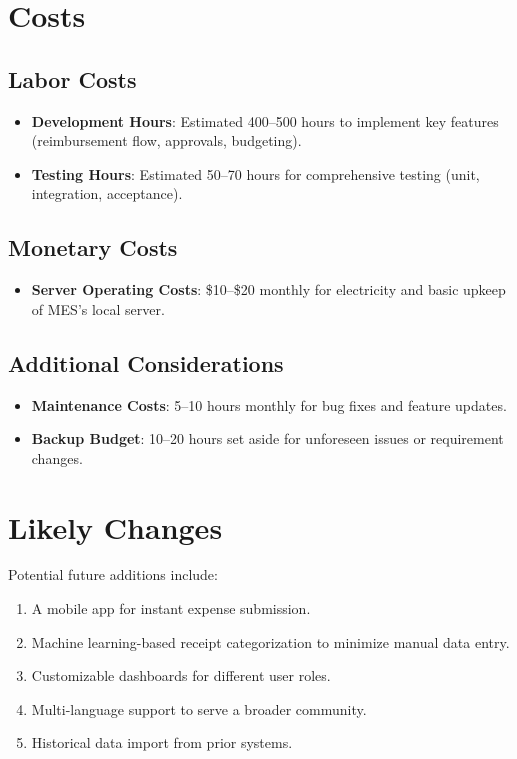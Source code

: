 \documentclass[12pt]{article}
\begin{document}
\section{Costs}
\subsection{Labor Costs}
\begin{itemize}
    \item \textbf{Development Hours}: Estimated 400--500 hours to implement key features (reimbursement flow, approvals, budgeting).
    \item \textbf{Testing Hours}: Estimated 50--70 hours for comprehensive testing (unit, integration, acceptance).
\end{itemize}

\subsection{Monetary Costs}
\begin{itemize}
    \item \textbf{Server Operating Costs}: \$10--\$20 monthly for electricity and basic upkeep of MES’s local server.
\end{itemize}

\subsection{Additional Considerations}
\begin{itemize}
    \item \textbf{Maintenance Costs}: 5--10 hours monthly for bug fixes and feature updates.
    \item \textbf{Backup Budget}: 10--20 hours set aside for unforeseen issues or requirement changes.
\end{itemize}

\section{Likely Changes}
Potential future additions include:
\begin{enumerate}
  \item A mobile app for instant expense submission.
  \item Machine learning-based receipt categorization to minimize manual data entry.
  \item Customizable dashboards for different user roles.
  \item Multi-language support to serve a broader community.
  \item Historical data import from prior systems.
\end{enumerate}
\end{document}
